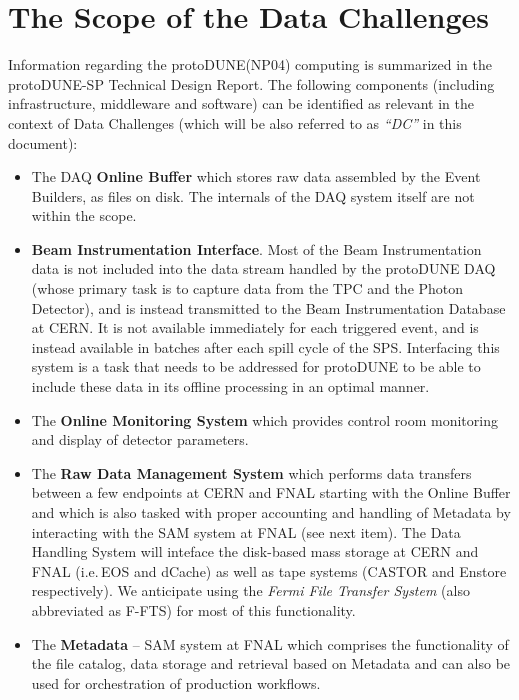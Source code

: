 \documentclass[pdftex,12pt,letter]{article}
\newcommand{\pd}{protoDUNE\xspace}
\begin{document}
\section{The Scope of the Data Challenges}
Information regarding the \pd (NP04) computing is summarized in the \pd-SP Technical Design Report\cite{docdb1794}.
The following components (including infrastructure, middleware and software) can be identified as relevant in the context
of Data Challenges (which will be also referred to as \textit{``DC''} in this document):
\begin{itemize}
\item The DAQ \textbf{Online Buffer} which stores raw data assembled by the Event Builders, as files on disk. The internals
of the DAQ system itself are not within the scope.

\item  \textbf{Beam Instrumentation Interface}. Most of the Beam Instrumentation data is not included into the data stream
handled by the \pd DAQ (whose primary task is to capture data from the TPC and the Photon Detector), and is instead
transmitted to the Beam Instrumentation Database at CERN. It is not available immediately for each triggered event,
and is instead available in batches after each spill cycle of the SPS. Interfacing this system is a task that needs
to be addressed for \pd to be able to include these data in its offline processing in an optimal manner.

\item The \textbf{Online Monitoring System} which provides control room monitoring and display of detector parameters. 

\item The \textbf{Raw Data Management System}\cite{docdb1212}  which performs data transfers between a few endpoints
at CERN and FNAL starting with the Online Buffer and which is also tasked with proper accounting and handling of Metadata
by interacting with the SAM system at FNAL (see next item). The Data Handling System will inteface the disk-based mass storage
at CERN and FNAL (i.e.\,EOS\cite{eos} and dCache) as well as tape systems (CASTOR and Enstore respectively).
We anticipate using the \textit{Fermi File Transfer System} (also abbreviated as F-FTS\cite{fts}) for most of this functionality.

\item The \textbf{Metadata}  -- SAM system at FNAL which comprises the functionality of the file catalog, data storage and
retrieval based on Metadata and can also be used for orchestration of production workflows.


\end{itemize}
\end{document}
